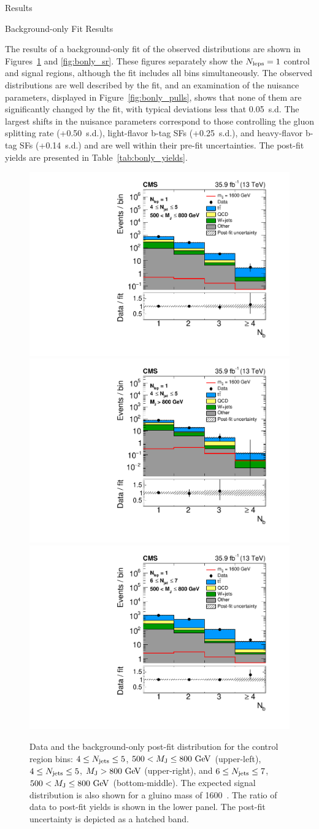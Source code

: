 \begin{section}{Results}

\begin{subsection}{Background-only Fit Results}

The results of a background-only fit of the observed \Nb distributions are shown in Figures~\ref{fig:bonly_cr} and \ref{fig:bonly_sr}.
These figures separately show the $N_{\mathrm{leps}} = 1$ control and signal regions, although the fit includes all bins simultaneously. 
The observed \Nb distributions are well described by the fit, and an examination of the nuisance parameters, displayed in Figure~\ref{fig:bonly_pulls}, shows that none of them are significantly changed by the fit, with typical deviations less that 0.05~s.d.
The largest shifts in the nuisance parameters correspond to those controlling the gluon splitting rate (+0.50~s.d.), light-flavor b-tag SFs (+0.25~s.d.), and heavy-flavor b-tag SFs (+0.14~s.d.) and are well within their pre-fit uncertainties.
The post-fit yields are presented in Table~\ref{tab:bonly_yields}.

\begin{figure}[tbp!]
\centering
\includegraphics[angle=0,width=0.45\columnwidth]{fig/bonly_nlep1_nj45_lowmj.pdf}
\includegraphics[angle=0,width=0.45\columnwidth]{fig/bonly_nlep1_nj45_highmj.pdf}
\includegraphics[angle=0,width=0.45\columnwidth]{fig/bonly_nlep1_nj67_lowmj.pdf}
\caption{Data and the background-only post-fit \Nb distribution for the control region bins: $4 \leq N_{\mathrm{jets}} \leq 5$, $500 < M_{\mathrm{J}} \leq 800~\mathrm{Ge\kern -0.1em V}$ (upper-left), $4 \leq N_{\mathrm{jets}} \leq 5$, $M_{\mathrm{J}} > 800~\mathrm{Ge\kern -0.1em V}$ (upper-right), and $6 \leq N_{\mathrm{jets}} \leq 7$, $500 < M_{\mathrm{J}} \leq 800~\mathrm{Ge\kern -0.1em V}$ (bottom-middle).
The expected signal distribution is also shown for a gluino mass of 1600~\GeV.
The ratio of data to post-fit yields is shown in the lower panel.
The post-fit uncertainty is depicted as a hatched band.}
\label{fig:bonly_cr}
\end{figure}


\end{subsection}
\end{section}
